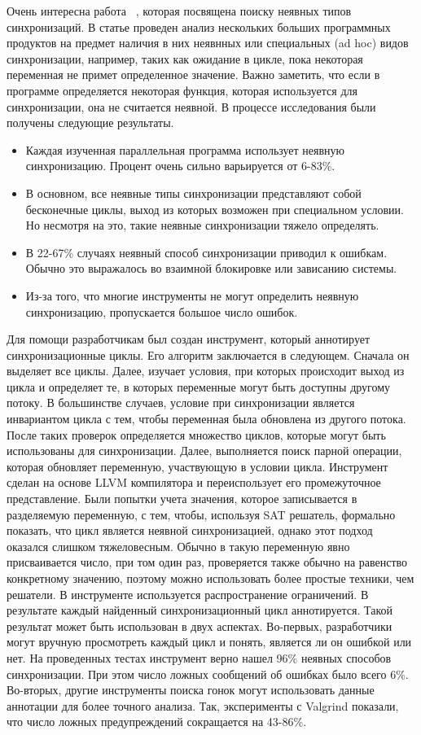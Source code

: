 Очень интересна работа ~\cite{Xiong:2010}, которая посвящена поиску неявных типов синхронизаций.
В статье проведен анализ нескольких больших программных продуктов на предмет наличия в них неявнных или специальных (ad hoc) видов синхронизации, например, таких как ожидание в цикле, пока некоторая переменная не примет определенное значение.
Важно заметить, что если в программе определяется некоторая функция, которая используется для синхронизации, она не считается неявной.
В процессе исследования были получены следующие результаты.

\begin{itemize}
\item Каждая изученная параллельная программа использует неявную синхронизацию. 
Процент очень сильно варьируется от 6-83\%.
\item В основном, все неявные типы синхронизации представляют собой бесконечные циклы, выход из которых возможен при специальном условии. Но несмотря на это, такие неявные синхронизации тяжело определять.
\item В 22-67\% случаях неявный способ синхронизации приводил к ошибкам. Обычно это выражалось во взаимной блокировке или зависанию системы. 
\item Из-за того, что многие инструменты не могут определить неявную синхронизацию, пропускается большое число ошибок. 
\end{itemize}

Для помощи разработчикам был создан инструмент, который аннотирует синхронизационные циклы.
Его алгоритм заключается в следующем. Сначала он выделяет все циклы.
Далее, изучает условия, при которых происходит выход из цикла и определяет те, в которых переменные могут быть доступны другому потоку.
В большинстве случаев, условие при синхронизации является инвариантом цикла с тем, чтобы переменная была обновлена из другого потока.
После таких проверок определяется множество циклов, которые могут быть использованы для синхронизации.
Далее, выполняется поиск парной операции, которая обновляет переменную, участвующую в условии цикла.
Инструмент сделан на основе LLVM  компилятора и переиспользует его промежуточное представление.
Были попытки учета значения, которое записывается в разделяемую переменную, с тем, чтобы, используя SAT решатель, формально показать, что цикл является неявной синхронизацией, однако этот подход оказался слишком тяжеловесным.
Обычно в такую переменную явно присваивается число, при том один раз, проверяется также обычно на равенство конкретному значению, поэтому можно использовать более простые техники, чем решатели. В инструменте используется распространение ограничений. 
В результате каждый найденный синхронизационный цикл аннотируется. Такой результат может быть использован в двух аспектах.
Во-первых, разработчики могут вручную просмотреть каждый цикл и понять, является ли он ошибкой или нет.
На проведенных тестах инструмент верно нашел 96\% неявных способов синхронизации. При этом число ложных сообщений об ошибках было всего 6\%.
Во-вторых, другие инструменты поиска гонок могут использовать данные аннотации для более точного анализа.
Так, эксперименты с Valgrind показали, что число ложных предупреждений сокращается на 43-86\%. 

